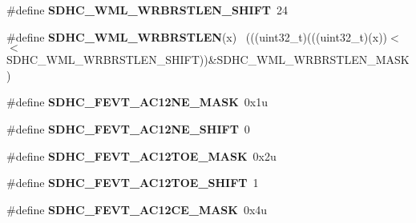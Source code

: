 \begin{DoxyCompactItemize}
\item 
\hypertarget{group___s_d_h_c___register___masks_ga347cd30bde44d964ab4ad25a8d17c9e6}{}\#define {\bfseries S\+D\+H\+C\+\_\+\+W\+M\+L\+\_\+\+W\+R\+B\+R\+S\+T\+L\+E\+N\+\_\+\+S\+H\+I\+F\+T}~24\label{group___s_d_h_c___register___masks_ga347cd30bde44d964ab4ad25a8d17c9e6}

\item 
\hypertarget{group___s_d_h_c___register___masks_ga1d7257ad3e23003869a0d1f318392625}{}\#define {\bfseries S\+D\+H\+C\+\_\+\+W\+M\+L\+\_\+\+W\+R\+B\+R\+S\+T\+L\+E\+N}(x)                                    ~(((uint32\+\_\+t)(((uint32\+\_\+t)(x))$<$$<$S\+D\+H\+C\+\_\+\+W\+M\+L\+\_\+\+W\+R\+B\+R\+S\+T\+L\+E\+N\+\_\+\+S\+H\+I\+F\+T))\&S\+D\+H\+C\+\_\+\+W\+M\+L\+\_\+\+W\+R\+B\+R\+S\+T\+L\+E\+N\+\_\+\+M\+A\+S\+K)\label{group___s_d_h_c___register___masks_ga1d7257ad3e23003869a0d1f318392625}

\item 
\hypertarget{group___s_d_h_c___register___masks_ga9f03ca4771ba7ba7dd17652cc0b3523f}{}\#define {\bfseries S\+D\+H\+C\+\_\+\+F\+E\+V\+T\+\_\+\+A\+C12\+N\+E\+\_\+\+M\+A\+S\+K}~0x1u\label{group___s_d_h_c___register___masks_ga9f03ca4771ba7ba7dd17652cc0b3523f}

\item 
\hypertarget{group___s_d_h_c___register___masks_gaaa25d15ca9ece7802c84eaabfcb610a3}{}\#define {\bfseries S\+D\+H\+C\+\_\+\+F\+E\+V\+T\+\_\+\+A\+C12\+N\+E\+\_\+\+S\+H\+I\+F\+T}~0\label{group___s_d_h_c___register___masks_gaaa25d15ca9ece7802c84eaabfcb610a3}

\item 
\hypertarget{group___s_d_h_c___register___masks_ga08461177de9d00d32471a042648a0d67}{}\#define {\bfseries S\+D\+H\+C\+\_\+\+F\+E\+V\+T\+\_\+\+A\+C12\+T\+O\+E\+\_\+\+M\+A\+S\+K}~0x2u\label{group___s_d_h_c___register___masks_ga08461177de9d00d32471a042648a0d67}

\item 
\hypertarget{group___s_d_h_c___register___masks_ga655231f1f3f9422f32cf26cfdb56b7d2}{}\#define {\bfseries S\+D\+H\+C\+\_\+\+F\+E\+V\+T\+\_\+\+A\+C12\+T\+O\+E\+\_\+\+S\+H\+I\+F\+T}~1\label{group___s_d_h_c___register___masks_ga655231f1f3f9422f32cf26cfdb56b7d2}

\item 
\hypertarget{group___s_d_h_c___register___masks_gabbde9b3a4bf7a5ba098a8793459a93e3}{}\#define {\bfseries S\+D\+H\+C\+\_\+\+F\+E\+V\+T\+\_\+\+A\+C12\+C\+E\+\_\+\+M\+A\+S\+K}~0x4u\label{group___s_d_h_c___register___masks_gabbde9b3a4bf7a5ba098a8793459a93e3}


\end{DoxyCompactItemize}
